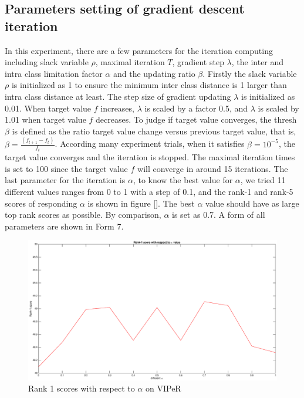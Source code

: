 \documentclass[conference,compsoc]{IEEEtran}
\begin{document}
\subsection{Parameters setting of gradient descent iteration}
In this experiment, there are a few parameters for the iteration computing including slack variable $\rho$, maximal iteration $T$, gradient step $\lambda$, the inter and intra class limitation factor $\alpha$ and the updating ratio $\beta$. Firstly the slack variable $\rho$ is initialized as 1 to ensure the minimum inter class distance is 1 larger than intra class distance at least. The step size of gradient updating $\lambda$ is initialized as 0.01. When target value $f$ increases,  $\lambda$ is scaled by a factor 0.5, and  $\lambda$ is scaled by 1.01 when target value $f$ decreases. To judge if target value converges, the thresh $\beta$ is defined as the ratio target value change versus previous target value, that is, $\beta = \frac{(f_{t+1}-f_t)}{f_t}$. According many experiment trials, when it satisfies $\beta = 10^{-5}$, the target value converges and the iteration is stopped. The maximal iteration times is set to 100 since the target value $f$ will converge in around 15 iterations.  The last parameter for the iteration is $\alpha$, to know the best value for $\alpha$, we tried 11 different values ranges from 0 to 1 with a step of 0.1, and the rank-1 and rank-5 scores of responding $\alpha$ is shown in figure []. The best $\alpha$ value should have as large top rank scores as possible. By comparison, $\alpha$ is set as 0.7. A form of all parameters are shown in Form 7.
\begin{figure}
\begin{raggedleft}
\includegraphics[width=1\linewidth]{Rank1scoresAlpha.eps}
\vspace{-3em}
\caption{Rank 1 scores with respect to $\alpha$ on VIPeR}
\end{raggedleft}
\end{figure}
\end{document}
